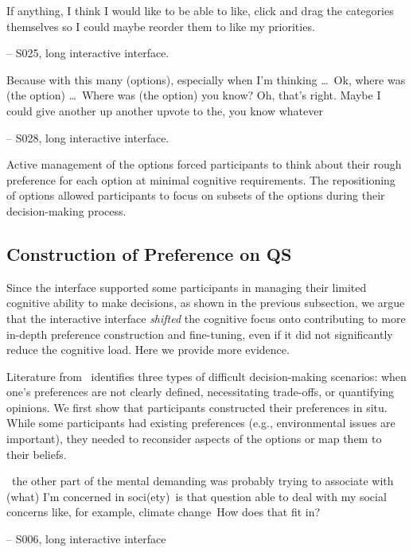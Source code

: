 \begin{displayquote}
If anything, I think I would like to be able to like, click and drag the categories themselves so I could maybe reorder them to like my priorities.

\noindent \hfill -- S025, long interactive interface.
\end{displayquote}

\begin{displayquote}
Because with this many (options), especially when I'm thinking \ldots\ Ok, where was (the option) \ldots\ Where was (the option) you know? Oh, that's right. Maybe I could give another up another upvote to the, you know whatever~\bracketellipsis

\noindent \hfill -- S028, long interactive interface.
\end{displayquote}

Active management of the options forced participants to think about their rough preference for each option at minimal cognitive requirements. The repositioning of options allowed participants to focus on subsets of the options during their decision-making process.



\subsection{Construction of Preference on QS}
Since the interface supported some participants in managing their limited cognitive ability to make decisions, as shown in the previous subsection, we argue that the interactive interface \textit{shifted} the cognitive focus onto contributing to more in-depth preference construction and fine-tuning, even if it did not significantly reduce the cognitive load. Here we provide more evidence.

Literature from~\textcite{lichtensteinConstructionPreference2006} identifies three types of difficult decision-making scenarios: when one's preferences are not clearly defined, necessitating trade-offs, or quantifying opinions. We first show that participants constructed their preferences in situ. While some participants had existing preferences (e.g., environmental issues are important), they needed to reconsider aspects of the options or map them to their beliefs.

\begin{displayquote}

~\bracketellipsis the other part of the mental demanding was probably trying to associate with (what) I'm concerned in soci(ety)~\bracketellipsis is that question able to deal with my social concerns like, for example, climate change~\bracketellipsis How does that fit in?

\noindent \hfill -- S006, long interactive interface
\end{displayquote}

